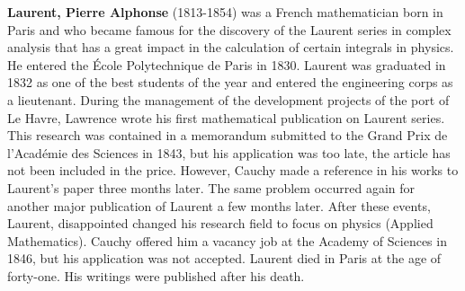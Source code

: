 \textbf{Laurent, Pierre Alphonse} (1813-1854) was a French mathematician born in Paris and who became famous for the discovery of the Laurent series in complex analysis that has a great impact in the calculation of certain integrals in physics. He entered the École Polytechnique de Paris in 1830. Laurent was graduated in 1832 as one of the best students of the year and entered the engineering corps as a lieutenant. During the management of the development projects of the port of Le Havre, Lawrence wrote his first mathematical publication on Laurent series. This research was contained in a memorandum submitted to the Grand Prix de l'Académie des Sciences in 1843, but his application was too late, the article has not been included in the price. However, Cauchy made a reference in his works to Laurent's paper three months later. The same problem occurred again for another major publication of Laurent a few months later. After these events, Laurent, disappointed changed his research field to focus on physics (Applied Mathematics). Cauchy offered him a vacancy job at the Academy of Sciences in 1846, but his application was not accepted. Laurent died in Paris at the age of forty-one. His writings were published after his death.

